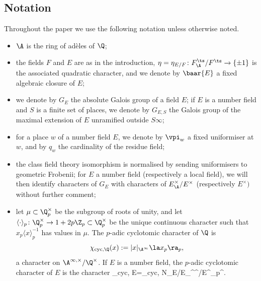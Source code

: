 \subsection{Notation}\label{sec: not1} Throughout the paper we use the  following notation unless otherwise noted.
\begin{itemize}
\item $\A$ is the ring of ad\`eles of $\Q$;
\item   the fields $F$ and $E$ are as in the introduction, $\eta=\eta_{E/F}\colon F_{\A}^{\ts}/F^{\ts}\to \{\pm 1\}$ is the associated quadratic character,  and we denote by  $\baar{E}$ a fixed  algebraic closure {of $E$};
\item we denote by $G_{E}$ the absolute Galois group of a field $E$; if $E$ is a number field and $S$ is a finite set of places, we denote by $G_{E, S}$ the Galois group of the maximal extension of $E$ unramified outside $S\infty$;
\item  for a place $w $ of  a number field $E$, we denote by $\vpi_{w}$ a fixed uniformiser at $w$, and by $q_{w} $ the cardinality of the residue field;
\item the class field theory isomorphism is normalised by sending uniformisers to geometric Frobenii; for $E$  a number field (respectively a local field), we will then identify   characters of $G_{E}$ with characters of $E_{\A}^{\times}/E^{\times}$ (respectively $E^{\times})$ without further comment;
\item let $\mu\subset \Q_{p}^{\times}$ be the subgroup of roots of unity, and let $\langle \cdot\rangle_{p}\colon \Q_{p}^{\times}\to 1+2p\Z_{p}\subset \Q_{p}^{\times} $ be the unique continuous character such that $x_{p}\langle x\rangle_{p}^{-1}$ has values in $\mu$.
The $p$-adic  cyclotomic character of $\Q$ is
 $$\chi_{{\rm cyc}, \Q}(x):=|x|_{\A^{\infty }}\la x_{p}\ra_{p} , $$ a character on $\A^{\infty,\times}/\Q^{\times}$.
   If $E$ is a number field, the $p$-adic cyclotomic character of $E$ is the character
    \beq{}\chi_{{\rm cyc}, E}=\chi_{{\rm cyc}, \Q } \circ N_{E/\Q}\colon E_{\A^{\infty}}^{\times}/E^{\times}\to \Q_{p}^{\times}.\eeq
\end{itemize}
